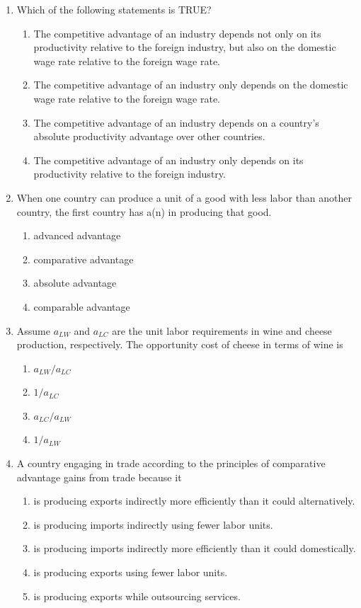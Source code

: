 \documentclass[12pt]{article}
\begin{document}
\begin{enumerate}[label=\textbf{\arabic*.}]
\item Which of the following statements is TRUE?
\begin{enumerate}[label=\Alph*.]
\item The competitive advantage of an industry depends not only on its productivity relative to the foreign industry, but also on the domestic wage rate relative to the foreign wage rate.
\item The competitive advantage of an industry only depends on the domestic wage rate relative to the foreign wage rate.
\item The competitive advantage of an industry depends on a country's absolute productivity advantage over other countries.
\item The competitive advantage of an industry only depends on its productivity relative to the foreign industry.
\end{enumerate}

\newpage
\item When one country can produce a unit of a good with less labor than another country, the first country has a(n) \underline{\hspace{2em}} in producing that good.
\begin{enumerate}[label=\Alph*.]
\item advanced advantage
\item comparative advantage
\item absolute advantage
\item comparable advantage
\end{enumerate}

\item Assume $a_{LW}$ and $a_{LC}$ are the unit labor requirements in wine and cheese production, respectively. The opportunity cost of cheese in terms of wine is
\begin{enumerate}[label=\Alph*.]
\item $a_{LW}/a_{LC}$
\item $1/a_{LC}$
\item $a_{LC}/a_{LW}$
\item $1/a_{LW}$
\end{enumerate}

\item A country engaging in trade according to the principles of comparative advantage gains from trade because it
\begin{enumerate}[label=\Alph*.]
\item is producing exports indirectly more efficiently than it could alternatively.
\item is producing imports indirectly using fewer labor units.
\item is producing imports indirectly more efficiently than it could domestically.
\item is producing exports using fewer labor units.
\item is producing exports while outsourcing services.
\end{enumerate}


\end{enumerate}
\end{document}

